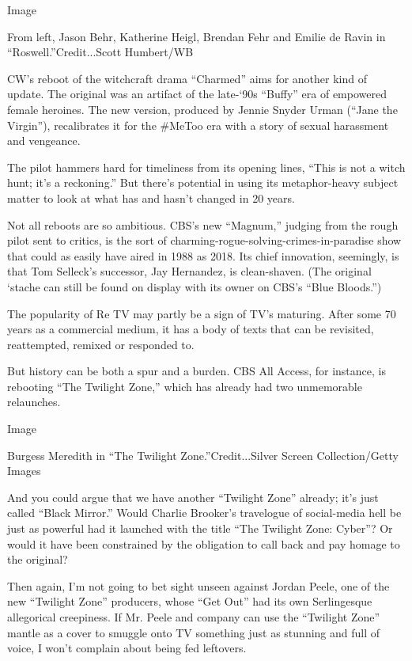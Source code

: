Image

From left, Jason Behr, Katherine Heigl, Brendan Fehr and Emilie de Ravin
in ``Roswell.''Credit...Scott Humbert/WB

CW's reboot of the witchcraft drama ``Charmed'' aims for another kind of
update. The original was an artifact of the late-`90s ``Buffy'' era of
empowered female heroines. The new version, produced by Jennie Snyder
Urman (``Jane the Virgin''), recalibrates it for the \#MeToo era with a
story of sexual harassment and vengeance.

The pilot hammers hard for timeliness from its opening lines, ``This is
not a witch hunt; it's a reckoning.'' But there's potential in using its
metaphor-heavy subject matter to look at what has and hasn't changed in
20 years.

Not all reboots are so ambitious. CBS's new ``Magnum,'' judging from the
rough pilot sent to critics, is the sort of
charming-rogue-solving-crimes-in-paradise show that could as easily have
aired in 1988 as 2018. Its chief innovation, seemingly, is that Tom
Selleck's successor, Jay Hernandez, is clean-shaven. (The original
`stache can still be found on display with its owner on CBS's ``Blue
Bloods.'')

The popularity of Re TV may partly be a sign of TV's maturing. After
some 70 years as a commercial medium, it has a body of texts that can be
revisited, reattempted, remixed or responded to.

But history can be both a spur and a burden. CBS All Access, for
instance, is rebooting ``The Twilight Zone,'' which has already had two
unmemorable relaunches.

Image

Burgess Meredith in ``The Twilight Zone.''Credit...Silver Screen
Collection/Getty Images

And you could argue that we have another ``Twilight Zone'' already; it's
just called ``Black Mirror.'' Would Charlie Brooker's travelogue of
social-media hell be just as powerful had it launched with the title
``The Twilight Zone: Cyber''? Or would it have been constrained by the
obligation to call back and pay homage to the original?

Then again, I'm not going to bet sight unseen against Jordan Peele, one
of the new ``Twilight Zone'' producers, whose ``Get Out'' had its own
Serlingesque allegorical creepiness. If Mr. Peele and company can use
the ``Twilight Zone'' mantle as a cover to smuggle onto TV something
just as stunning and full of voice, I won't complain about being fed
leftovers.

